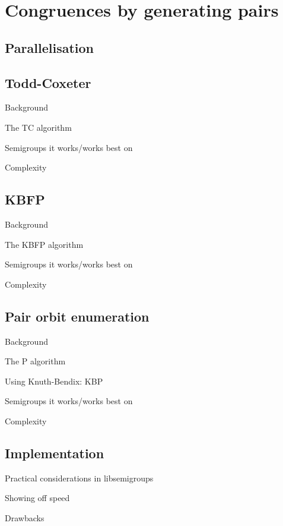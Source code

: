 \chapter{Congruences by generating pairs}
\label{chap:pairs}

\lipsum[2]

\section{Parallelisation}

\section{Todd-Coxeter}
\label{sec:tc}

Background

The TC algorithm

Semigroups it works/works best on

Complexity

\section{KBFP}
\label{sec:kbfp}

Background

The KBFP algorithm

Semigroups it works/works best on

Complexity

\section{Pair orbit enumeration}
\label{sec:p}

Background

The P algorithm

Using Knuth-Bendix: KBP

Semigroups it works/works best on

Complexity

\section{Implementation}

Practical considerations in libsemigroups

Showing off speed

Drawbacks
